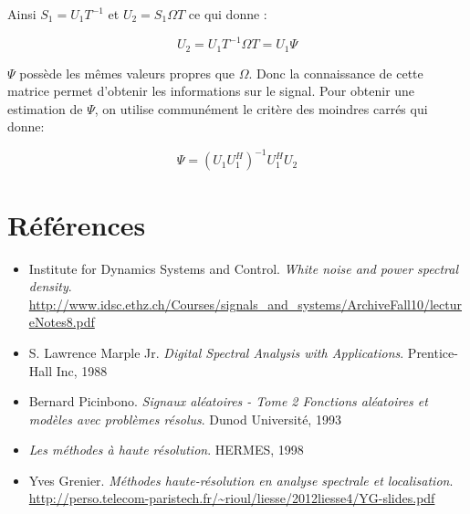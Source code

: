 \documentclass{article}
\begin{document}
\vspace*{20pt}

Ainsi \( S_1 = U_1 T^{-1}\) et \( U_2 = S_1 \Omega T \) ce qui donne :

\begin{equation}
U_2 = U_1 T^{-1} \Omega T = U_1 \Psi
\end{equation}

\( \Psi \) possède les mêmes valeurs propres que \( \Omega \). Donc la connaissance de cette matrice permet d'obtenir les informations sur le signal. Pour obtenir une estimation de \(\Psi\), on utilise communément le critère des moindres carrés qui donne:

\begin{equation}
\Psi = (U_1 U_1^H)^{-1} U_1^H U_2
\end{equation}



\newpage

%
%

\section {Références}

\begin{itemize}
\item 
Institute for Dynamics Systems and Control. \textit{White noise and power spectral density}.\\
\url{http://www.idsc.ethz.ch/Courses/signals_and_systems/ArchiveFall10/lectureNotes8.pdf}

\item S. Lawrence Marple Jr. \textit{Digital Spectral Analysis with Applications}. Prentice-Hall Inc, 1988

\item Bernard Picinbono. \textit{Signaux aléatoires - Tome 2 Fonctions aléatoires et modèles avec problèmes résolus}. Dunod Université, 1993

\item \textit{Les méthodes à haute résolution}. HERMES, 1998

\item Yves Grenier. \textit{Méthodes haute-résolution en analyse spectrale et localisation}. \\
\url{http://perso.telecom-paristech.fr/~rioul/liesse/2012liesse4/YG-slides.pdf}

\end{itemize}
\end{document}
